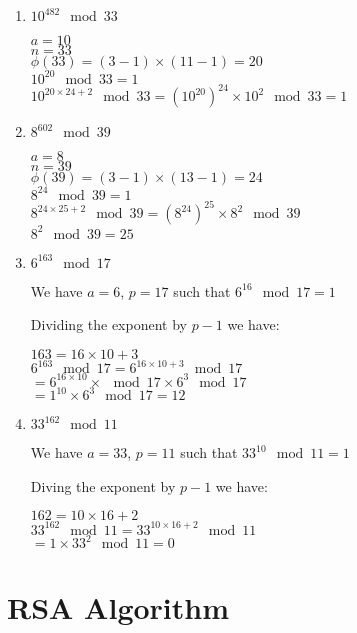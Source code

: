 \documentclass[12]{article}
\begin{document}
	\begin{enumerate}
		\item $10^{482} \mod 33$
		
		 $a = 10$ \\
		 $n = 33$ \\ 
		 
		 $\phi(33) = ( 3 - 1 ) \times ( 11 - 1 ) = 20$ \\
		 $10^{20} \mod 33 = 1 $ \\
		 $10^{20 \times 24 + 2} \mod 33 = ( 10^{20})^{24} \times 10^2 \mod 33 = 1$
		 
		 \item $8^{602} \mod 39$
		
		  $a = 8$ \\
		  $n = 39$ \\
		  $\phi(39) = ( 3 - 1 ) \times  ( 13 - 1 ) =  24$ \\
		  $8^{24} \mod  39 = 1 $ \\
		  $8^{ 24 \times 25 + 2 } \mod 39 = (8^{24} )^{25} \times 8^2 \mod 39$ \\
		  $8^2 \mod 39 =  25$
		  
		  \item $6^{163} \mod 17 $
		  
		  We have  $a = 6$, $p = 17$ such that $6^{16} \mod 17 = 1$
		  
		  Dividing the exponent by $p - 1$ we have: 
		  
		  $163 =  16 \times 10 + 3$ \\
		  $6^{163} \mod 17 = 6^{16 \times 10 + 3} \mod 17$\\
		  $= 6^{16 \times 10}  \times \mod 17 \times 6^3 \mod 17$\\
  		  $= 1^{10} \times 6^3 \mod 17 =  12$ \\
  		  
		  
		  \item $ 33^{162}\mod 11$
		  
		  We have $a = 33$,  $p = 11$ such that $33^{10} \mod 11 = 1$
		  
		  Diving  the exponent by $p - 1$ we have:
		  
		  $162 = 10 \times 16 + 2$ \\
		  $33^{162} \mod 11 =  33^{10 \times 16 +2 } \mod  11$ \\
		  $=  1 \times 33^{2} \mod 11 = 0$
		
	\end{enumerate}
	
\section{ RSA Algorithm }	
\end{document}
